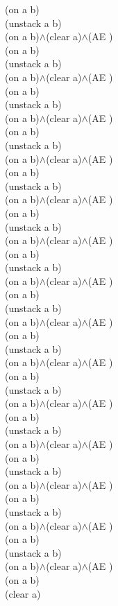 {{(on a b)\\
(unstack a b)\\
(on a b)$\wedge$(clear a)$\wedge$(AE )\\
(on a b)\\
(unstack a b)\\
(on a b)$\wedge$(clear a)$\wedge$(AE )\\
(on a b)\\
(unstack a b)\\
(on a b)$\wedge$(clear a)$\wedge$(AE )\\
(on a b)\\
(unstack a b)\\
(on a b)$\wedge$(clear a)$\wedge$(AE )\\
(on a b)\\
(unstack a b)\\
(on a b)$\wedge$(clear a)$\wedge$(AE )\\
(on a b)\\
(unstack a b)\\
(on a b)$\wedge$(clear a)$\wedge$(AE )\\
(on a b)\\
(unstack a b)\\
(on a b)$\wedge$(clear a)$\wedge$(AE )\\
(on a b)\\
(unstack a b)\\
(on a b)$\wedge$(clear a)$\wedge$(AE )\\
(on a b)\\
(unstack a b)\\
(on a b)$\wedge$(clear a)$\wedge$(AE )\\
(on a b)\\
(unstack a b)\\
(on a b)$\wedge$(clear a)$\wedge$(AE )\\
(on a b)\\
(unstack a b)\\
(on a b)$\wedge$(clear a)$\wedge$(AE )\\
(on a b)\\
(unstack a b)\\
(on a b)$\wedge$(clear a)$\wedge$(AE )\\
(on a b)\\
(unstack a b)\\
(on a b)$\wedge$(clear a)$\wedge$(AE )\\
(on a b)\\
(unstack a b)\\
(on a b)$\wedge$(clear a)$\wedge$(AE )\\
(on a b)\\
(clear a)\\
}%
}

